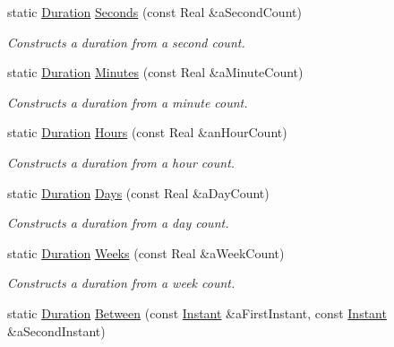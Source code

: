 \begin{DoxyCompactItemize}
static \hyperlink{classostk_1_1physics_1_1time_1_1_duration}{Duration} \hyperlink{classostk_1_1physics_1_1time_1_1_duration_ad973fa34fcc308fdcc8d50c3ee694764}{Seconds} (const Real \&a\+Second\+Count)
\begin{DoxyCompactList}\small\item\em Constructs a duration from a second count. \end{DoxyCompactList}\item 
static \hyperlink{classostk_1_1physics_1_1time_1_1_duration}{Duration} \hyperlink{classostk_1_1physics_1_1time_1_1_duration_a1cd2884c6bb89071780c7dffcba9b49f}{Minutes} (const Real \&a\+Minute\+Count)
\begin{DoxyCompactList}\small\item\em Constructs a duration from a minute count. \end{DoxyCompactList}\item 
static \hyperlink{classostk_1_1physics_1_1time_1_1_duration}{Duration} \hyperlink{classostk_1_1physics_1_1time_1_1_duration_a950723133d46c93a06907543d15e4dc0}{Hours} (const Real \&an\+Hour\+Count)
\begin{DoxyCompactList}\small\item\em Constructs a duration from a hour count. \end{DoxyCompactList}\item 
static \hyperlink{classostk_1_1physics_1_1time_1_1_duration}{Duration} \hyperlink{classostk_1_1physics_1_1time_1_1_duration_aefb4abc87c6957d00650228d069fa1e1}{Days} (const Real \&a\+Day\+Count)
\begin{DoxyCompactList}\small\item\em Constructs a duration from a day count. \end{DoxyCompactList}\item 
static \hyperlink{classostk_1_1physics_1_1time_1_1_duration}{Duration} \hyperlink{classostk_1_1physics_1_1time_1_1_duration_a6186e3350364f407e390f520b93dbf83}{Weeks} (const Real \&a\+Week\+Count)
\begin{DoxyCompactList}\small\item\em Constructs a duration from a week count. \end{DoxyCompactList}\item 
static \hyperlink{classostk_1_1physics_1_1time_1_1_duration}{Duration} \hyperlink{classostk_1_1physics_1_1time_1_1_duration_a6e3ed5971283cccf4cbc591dd7919efa}{Between} (const \hyperlink{classostk_1_1physics_1_1time_1_1_instant}{Instant} \&a\+First\+Instant, const \hyperlink{classostk_1_1physics_1_1time_1_1_instant}{Instant} \&a\+Second\+Instant)

\end{DoxyCompactItemize}
